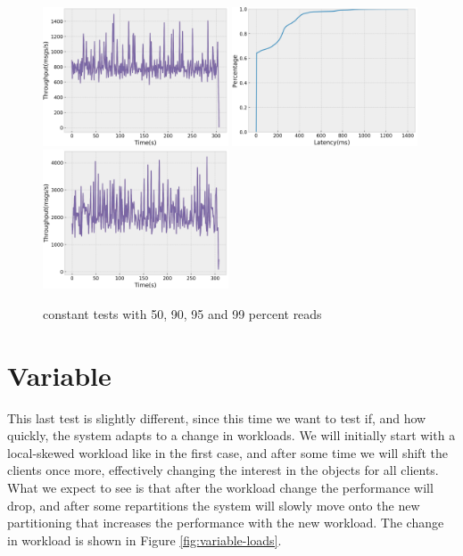\begin{figure}[H]
  \includegraphics[width=0.49\textwidth,height=\textheight,keepaspectratio]{img/constant5_tp.png}
  \includegraphics[width=0.49\textwidth,height=\textheight,keepaspectratio]{img/constant1_lat.png}
  \includegraphics[width=0.49\textwidth,height=\textheight,keepaspectratio]{img/constant1_tp.png}
  \caption{ constant tests with 50, 90, 95 and 99 percent reads }
  \label{fig:constant50-performance}
\end{figure}
\newpage
\section{Variable}\label{sec:variable}
This last test is slightly different, since this time we want to test if, and how quickly, the system adapts to a change in workloads. We will initially start with a local-skewed workload like in the first case, and after some time we will shift the clients once more, effectively changing the interest in the objects for all clients. What we expect to see is that after the workload change the performance will drop, and after some repartitions the system will slowly move onto the new partitioning that increases the performance with the new workload. The change in workload is shown in Figure \ref{fig:variable-loads}.

